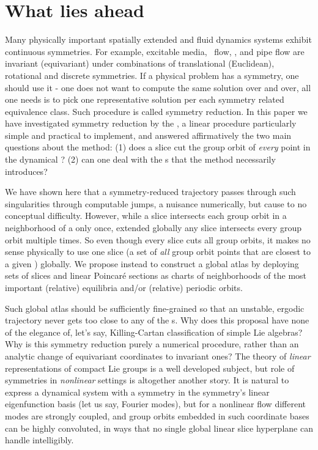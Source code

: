 \documentclass[preprint,12pt]{elsarticle} %
\begin{document}
\section{What lies ahead} %
    \label{sec:concl}

Many physically important spatially extended and fluid dynamics systems
exhibit continuous symmetries. For example,  excitable
media, \KS\
flow, {\pCf}, and
pipe flow\rf{Wk04,Kerswell05} are invariant (equivariant) under
combinations of translational (Euclidean), rotational and discrete
symmetries. If a physical problem has a symmetry, one should use it - one
does not want to compute the same solution over and over, all one needs
is to pick one representative solution per each symmetry related
equivalence class. Such procedure is called symmetry reduction.  In this
paper we have investigated symmetry reduction by the \mslices, a linear
procedure particularly simple and practical to implement, and answered
affirmatively the two main questions about the method:
(1) does a slice cut the group orbit of \emph{every} point in the
dynamical \statesp?
(2) can one deal with the {\sset s} that the method necessarily
introduces?

We have shown here that a symmetry-reduced trajectory passes through such
singularities through computable jumps, a nuisance numerically, but cause
to no conceptual difficulty. However, while a slice intersects each group
orbit in a neighborhood of a {\template} only once, extended globally any
slice intersects every group orbit multiple times. So even though every
slice cuts all group orbits, it makes no sense physically to use one
slice (a set of \emph{all} group orbit points that are closest to a given
{\template}) globally. We propose instead to construct a global atlas by
deploying sets of slices and linear Poincar\'e sections as charts of
neighborhoods of the most important (relative) equilibria and/or
(relative) periodic orbits.

Such global atlas should be sufficiently fine-grained so that an
unstable, ergodic trajectory never gets too close to any of the {\sset
s}. Why does this proposal have none of the elegance of, let's say,
Killing-Cartan classification of simple Lie algebras? Why is this
symmetry reduction purely a numerical procedure, rather than an analytic
change of equivariant coordinates to invariant ones? The theory of
\emph{linear} representations of compact Lie groups is a well developed
subject, but role of symmetries in \emph{nonlinear} settings is
altogether another story. It is natural to express a dynamical system
with a symmetry in the symmetry's linear eigenfunction basis (let  us
say, Fourier modes), but for a nonlinear flow different modes are
strongly coupled, and group orbits embedded in such coordinate bases can
be highly convoluted, in ways that no single global linear slice
hyperplane can handle intelligibly.
\end{document}
